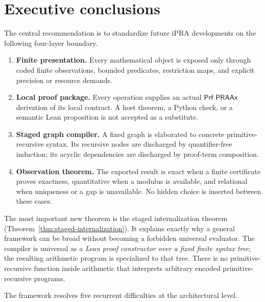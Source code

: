 \section*{Executive conclusions}

The central recommendation is to standardize future iPRA developments on the
following four-layer boundary.

\begin{enumerate}[label=\textbf{L\arabic*.}]
\item \textbf{Finite presentation.}  Every mathematical object is exposed only
through coded finite observations, bounded predicates, restriction maps, and
explicit precision or resource demands.
\item \textbf{Local proof package.}  Every operation supplies an actual
\(\mathsf{Prf}\;\mathsf{PRAAx}\) derivation of its local contract.  A host theorem, a Python
check, or a semantic Lean proposition is not accepted as a substitute.
\item \textbf{Staged graph compiler.}  A fixed graph is elaborated to concrete
primitive-recursive syntax.  Its recursive nodes are discharged by
quantifier-free induction; its acyclic dependencies are discharged by
proof-term composition.
\item \textbf{Observation theorem.}  The exported result is exact when a finite
certificate proves exactness, quantitative when a modulus is available, and
relational when uniqueness or a gap is unavailable.  No hidden choice is
inserted between these cases.
\end{enumerate}

The most important new theorem is the staged internalization theorem
(Theorem~\ref{thm:staged-internalization}).  It explains exactly why a general
framework can be broad without becoming a forbidden universal evaluator.  The
compiler is universal as a \emph{Lean proof constructor over a fixed finite
syntax tree}; the resulting arithmetic program is specialized to that tree.
There is no primitive-recursive function inside arithmetic that interprets
arbitrary encoded primitive-recursive programs.

The framework resolves five recurrent difficulties at the architectural
level.

